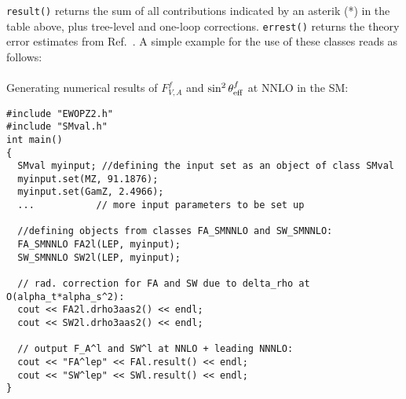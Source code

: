 \documentclass[12pt]{article}
\newcommand{\seff}[1]{\sin^2\theta_{\rm eff}^{#1}}
\newcommand{\fva}[1]{F_{V,A}^{#1}}
\begin{document}
\texttt{result()} returns the sum of all contributions indicated by an asterik (*) in the table above, plus tree-level and one-loop corrections. \texttt{errest()} returns the theory error estimates from Ref.~\cite{Dubovyk:2019szj}. A simple example for the use of these classes reads as follows:

\paragraph{}Generating numerical results of $\fva f$ and $\seff f$ at NNLO in the SM: \label{fig:codeeg3}
{    \centering
\begin{lstlisting}
#include "EWOPZ2.h"
#include "SMval.h"
int main()
{
  SMval myinput; //defining the input set as an object of class SMval
  myinput.set(MZ, 91.1876);
  myinput.set(GamZ, 2.4966);
  ...           // more input parameters to be set up

  //defining objects from classes FA_SMNNLO and SW_SMNNLO:
  FA_SMNNLO FA2l(LEP, myinput);
  SW_SMNNLO SW2l(LEP, myinput); 

  // rad. correction for FA and SW due to delta_rho at O(alpha_t*alpha_s^2):
  cout << FA2l.drho3aas2() << endl;
  cout << SW2l.drho3aas2() << endl;
  
  // output F_A^l and SW^l at NNLO + leading NNNLO:
  cout << "FA^lep" << FAl.result() << endl; 
  cout << "SW^lep" << SWl.result() << endl; 
}
\end{lstlisting}}
\end{document}
